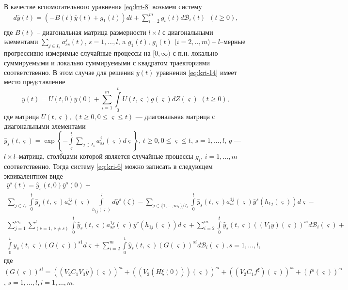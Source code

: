 В качестве вспомогательного уравнения \eqref{eq:kri-8} возьмем систему
\begin{equation}
    \label{eq:kri-14}
    \begin {array}{crl}
     d \bar y(t) =  (- B(t)\bar  y(t) + g_1(t))dt+\sum
    \limits_{i=2}^{m}g_i(t)d\mathcal
    B_i(t) \, \, \, (t \ge 0),\\
    \end {array}
\end{equation}
где $B(t)$ -- диагональная матрица размерности $l\times l$ с
диагональными элементами $ \sum \limits_{j\in I_s}a^{j}_{ss}(t)$, $s
= 1,...,l$, a $g_1(t)$, $g_i(t)$ ($i=2,..,m$) -- $l$--мерные
прогрессивно измеримые случайные процессы на $[0, \infty )$ с п.н.
локально суммируемыми и локально суммируемыми с квадратом
траекториями соответственно. В этом случае для решения $\bar y(t)$
уравнения \eqref{eq:kri-14}  имеет место представление
$$
 \bar y(t) = U(t,0) \bar y(0) + \sum \limits_{i=1}^{m}\int \limits _0^t
 U(t,\varsigma)g(\varsigma)dZ(\varsigma) \,\, (t \geq 0),
$$
где  матрица $U(t, \varsigma), \, (t \ge 0, 0 \leq \varsigma \leq
t)$ --- диагональная матрица с диагональными элементами $ \hat y_s(t
,\varsigma) =\exp\left \{-\int \limits _\varsigma^t\sum
\limits_{j\in I_s}a^{j}_{ss}(\varsigma)d\varsigma \right \}, \, t
\ge 0, 0 \leq \varsigma \leq t, \, s = 1, ..., l$, $g$ --- $l\times
l$--матрица, столбцами которой является случайные процессы $g_i$, $i
= 1, ..., m$ соответственно. Тогда систему \eqref{eq:kri-6} можно записать в
следующем эквивалентном виде
\begin{equation}
    \label{eq:kri-15}
    \begin{array}{crl}
    \bar y^s(t) = \hat y_s(t,0 )\bar y^s(0) +\\
     \sum \limits_{j \in
    I_s}\int \limits _0^t \hat y_s(t,\varsigma) a^{1j}_{ss}(\varsigma
    )\int \limits _{h_{1j}(\varsigma )}^\varsigma d \bar y^s(\zeta) -
    \sum \limits_{j \in\{1,...,m_1\} / I_s} \int \limits _0^t \hat
    y_s(t,\varsigma) a^{1j}_{ss}(\varsigma ) \bar y^s(h_{1j}(\varsigma
    ))d\varsigma  - \\
    \sum \limits_{j=1}^{m_1}\sum \limits_{(\nu=1,\, \nu \neq s)}^{l}\int
    \limits _0^t \hat y_s(t,\varsigma) a^{1j}_{s\nu}(\varsigma ) \bar
    y^\nu(h_{1j}(\varsigma ))d\varsigma  +
     \sum \limits_{i=2}^{m} \int \limits _0^t
    \hat y_s(t,\varsigma)((V_1\bar y)(\varsigma))^{si}d\mathcal
    B_i(\varsigma) + \\
    \int \limits _0^t \hat y_s(t,\varsigma)(G(\varsigma))^{s1}
    d\varsigma + \sum \limits_{i=2}^{m} \int \limits _0^t \hat
    y_s(t,\varsigma) (G(\varsigma))^{si} d\mathcal B_i(\varsigma), s =
    1, ... , l,
    \end{array}
\end{equation}
где $(G(\varsigma))^{si}  = ((V_2\bar C_1V_3\bar y)(\varsigma))^{si}
+ ((V_2(\bar H \bar \xi(0)))(\varsigma))^{si}+ ((V_2 \bar C_1
f^\xi)(\varsigma))^{si} + (f^y(\varsigma))^{si}$, $s = 1, ... , l, i
= 1, ... , m$.

